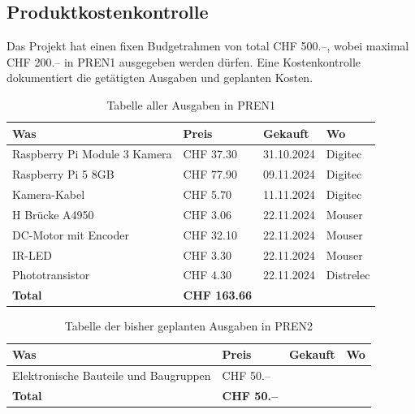 \documentclass[../main.tex]{subfiles}
\begin{document}
\subsection{Produktkostenkontrolle}
Das Projekt hat einen fixen Budgetrahmen von total CHF 500.--, wobei maximal CHF 200.-- in PREN1 ausgegeben werden dürfen. Eine Kostenkontrolle dokumentiert die getätigten Ausgaben und geplanten Kosten.
\begin{table}[H]
\begin{tabular}{|p{6cm}|p{2.5cm}|p{2cm}|p{2.5cm}|}
\hline
\textbf{Was} & \textbf{Preis} & \textbf{Gekauft} & \textbf{Wo} \\ \hline
Raspberry Pi Module 3 Kamera & CHF 37.30 & 31.10.2024 & Digitec \\ \hline
Raspberry Pi 5 8GB & CHF 77.90 & 09.11.2024 & Digitec \\ \hline
Kamera-Kabel & CHF 5.70 & 11.11.2024 & Digitec \\ \hline
H Brücke A4950 & CHF 3.06 & 22.11.2024 & Mouser \\ \hline
DC-Motor mit Encoder & CHF 32.10 & 22.11.2024 & Mouser \\ \hline
IR-LED & CHF 3.30 & 22.11.2024 & Mouser \\ \hline
Phototransistor & CHF 4.30 & 22.11.2024 & Distrelec \\ \hline
\hline
\textbf{Total} & \textbf{CHF 163.66} & & \\ \hline
\end{tabular}
\caption{Tabelle aller Ausgaben in PREN1}
\label{tab:ausgaben_pren1}
\end{table}

\begin{table}[H]
\begin{tabular}{|p{6cm}|p{2.5cm}|p{2cm}|p{2.5cm}|}
\hline
\textbf{Was} & \textbf{Preis} & \textbf{Gekauft} & \textbf{Wo} \\ \hline
Elektronische Bauteile und Baugruppen & CHF 50.-- &  &  \\ \hline

\hline
\textbf{Total} & \textbf{CHF 50.--} & & \\ \hline
\end{tabular}
\caption{Tabelle der bisher geplanten Ausgaben in PREN2}
\label{tab:ausgaben_pren2}
\end{table}
\end{document}
